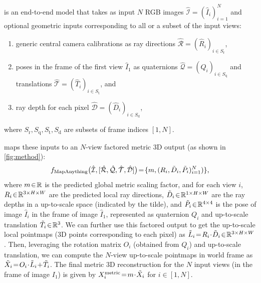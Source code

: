 \section{\coolname{}}
\label{sec:approach}


\label{subsec:approach_overview}

\coolname is an end-to-end model that takes as input $N$ RGB images $\hat{\mathcal{I}} \!=\! (\hat{I}_i)_{i=1}^N$ and optional geometric inputs corresponding to all or a subset of the input views:
\begin{enumerate}[label=(\textbf{\alph*})]
\item %
generic central camera calibrations \cite{GrossN2001,VasilGAPBSG2020,ZhangLKYRT2024} as ray directions $\hat{\mathcal{R}} \!=\! (\hat{R}_i)_{i \in S_\text{r}}$,

\item %
poses in the frame of the first view $\hat{I}_1$ as quaternions $\hat{\mathcal{Q}} \!=\! (\hat{Q}_i)_{i \in S_\text{q}}$ and translations $\hat{\mathcal{T}} \!=\! (\hat{T}_i)_{i \in S_\text{t}}$, and

\item %
ray depth for each pixel $\hat{\mathcal{D}} \!=\! (\hat{D}_i)_{i \in S_\text{d}}$,
\end{enumerate}
where $S_\text{r}, S_\text{q}, S_\text{t}, S_\text{d}$ are subsets of frame indices $[1, N]$.


\coolname maps these inputs to an $N$-view factored metric 3D output (as shown in \cref{fig:method}):
\begin{equation}
    \label{eq:MapAnything}
    \!f_\text{MapAnything}\bigl(\hat{\mathcal{I}}, [\hat{\mathcal{R}}, \hat{\mathcal{Q}}, \hat{\mathcal{T}}, \hat{\mathcal{D}}] \bigr)
    \!=\! \{m, (R_i, \tilde{D}_i, \tilde{P}_i)_{i=1}^N) \}
     \text{,}  
\end{equation}
where $m \!\in\! \mathbb{R}$ is the predicted global metric scaling factor, and for each view $i$,
$R_i \!\in\! \mathbb{R}^{3 \times H \times W}$ are the predicted local ray directions,
$\tilde{D}_i \!\in\! \mathbb{R}^{1 \times H \times W}$ are the ray depths in a up-to-scale space (indicated by the tilde),
and $\tilde{P}_i \!\in\! \mathbb{R}^{4 \times 4}$ is the pose of image $\hat{I}_i$ in the frame of image $\hat{I}_1$, represented as quaternion $Q_i$
and up-to-scale translation $\tilde{T}_i \!\in\! \mathbb{R}^3$.
We can further use this factored output to get the up-to-scale local pointmaps (3D points corresponding to each pixel) as $\tilde{L}_i \!=\! R_i \!\cdot\! \tilde{D}_i \!\in\! \mathbb{R}^{3 \times H \times W}$.
Then, leveraging the rotation matrix ${O}_i$ 
(obtained from $Q_i$) and up-to-scale translation, we can compute the $N$-view up-to-scale pointmaps in world frame as $\tilde{X}_i \!=\! {O}_i \!\cdot\! \tilde{L}_i \!+\! \tilde{T}_i$.
The final metric 3D reconstruction for the $N$ input views (in the frame of image $I_1$) is given by
${X}^\text{metric}_i \!=\! m \!\cdot\! \tilde{X}_i$ for $i \!\in\! [1, N]$.



